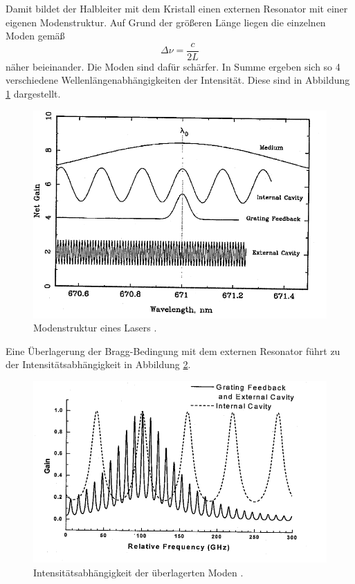 Damit bildet der Halbleiter mit dem Kristall einen externen Resonator
mit einer eigenen Modenstruktur. Auf Grund der größeren Länge liegen die einzelnen Moden gemäß 
\begin{equation}
    \Delta \nu = \frac{c}{2L}
\end{equation}
näher beieinander. Die Moden sind dafür schärfer. In Summe ergeben sich so 4 verschiedene Wellenlängenabhängigkeiten der Intensität.
Diese sind in Abbildung \ref{fig:Moden} dargestellt.
\begin{figure}[H]
    \centering
    \includegraphics[scale=0.8]{pictures/Moden.png}
    \caption{Modenstruktur eines Lasers \cite{teachspin}.}
    \label{fig:Moden}
\end{figure}
\noindent Eine Überlagerung der Bragg-Bedingung mit dem externen Resonator führt zu der Intensitätsabhängigkeit in Abbildung \ref{fig:Moden1}.
\begin{figure}[H]
    \centering
    \includegraphics[scale=0.8]{pictures/Moden1.png}
    \caption{Intensitätsabhängigkeit der überlagerten Moden \cite{teachspin}.}
    \label{fig:Moden1}
\end{figure}
